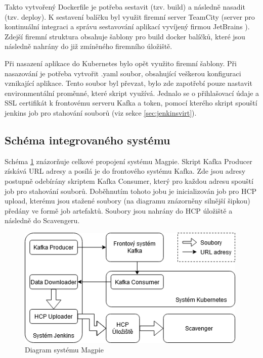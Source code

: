 \documentclass[thesis=M,czech,hidelinks]{FITthesis}[2013/05/06]
\begin{document}
Takto vytvořený Dockerfile je potřeba sestavit (tzv. build) a následně nasadit (tzv. deploy). K sestavení balíčku byl využit firemní server TeamCity (server pro kontinuální integraci a správu sestavování aplikací vyvíjený firmou JetBrains \cite{teamcity}). Zdejší firemní struktura obsahuje šablony pro build docker balíčků, které jsou následně nahrány do již zmíněného firemního úložiště.

Při nasazení aplikace do Kubernetes bylo opět využito firemní šablony. Při nasazování je potřeba vytvořit .yaml soubor, obsahující veškerou konfiguraci vznikající aplikace. Tento soubor byl převzat, bylo zde zapotřebí pouze nastavit environmentální proměnné, které skript využívá. Jednalo se o přihlašovací údaje a SSL certifikát k frontovému serveru Kafka a token, pomocí kterého skript spouští jenkins job pro stahování souborů (viz sekce \ref{sec:jenkinsvirt}).


\subsection{Schéma integrovaného systému}

Schéma \ref{fig:schema} znázorňuje celkové propojení systému Magpie. Skript Kafka Producer získává URL adresy a posílá je do frontového systému Kafka. Zde jsou adresy postupně odebírány skriptem Kafka Consumer, který pro každou adresu spouští job pro stahování souborů. Doběhnutím tohoto jobu je inicializován job pro HCP upload, kterému jsou stažené soubory (na diagramu znázorněny silnější šipkou) předány ve formě job artefaktů. Soubory jsou nahrány do HCP úložiště a následně do Scavengeru.

\begin{figure}[h]
	\centering
	\includegraphics[width=11cm]{pictures/project_diagram.png}
	\caption{Diagram systému Magpie}
	\label{fig:schema}
\end{figure}
\end{document}
